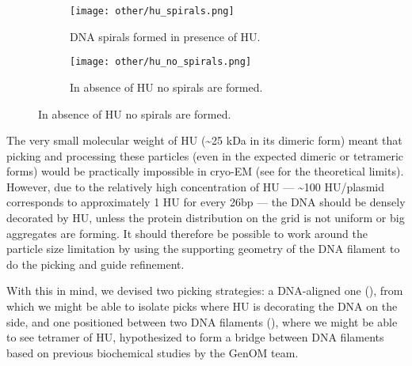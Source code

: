 \begin{figure}
    \centering
    \begin{subfigure}[B]{.49\textwidth}
        \centering
        \texttt{[image: other/hu\_spirals.png]}
        \caption{DNA spirals formed in presence of HU.}
        \label{fig:hu_spirals}
    \end{subfigure}%
    \hfill
    \begin{subfigure}[B]{.49\textwidth}
        \centering
        \texttt{[image: other/hu\_no\_spirals.png]}
        \caption{In absence of HU no spirals are formed.}
        \label{fig:hu_no_spirals}
    \end{subfigure}%
    \label{fig:hu_spirals_all}
\end{figure}

The very small molecular weight of HU (\sim25 kDa in its dimeric form) meant that picking and processing these particles (even in the expected dimeric or tetrameric forms) would be practically impossible in cryo-EM (see  for the theoretical limits).
However, due to the relatively high concentration of HU --- \sim100 HU/plasmid corresponds to approximately 1 HU for every 26bp --- the DNA should be densely decorated by HU, unless the protein distribution on the grid is not uniform or big aggregates are forming.
It should therefore be possible to work around the particle size limitation by using the supporting geometry of the DNA filament to do the picking and guide refinement.

With this in mind, we devised two picking strategies: a DNA-aligned one (), from which we might be able to isolate picks where HU is decorating the DNA on the side, and one positioned between two DNA filaments (), where we might be able to see tetramer of HU, hypothesized to form a bridge between DNA filaments based on previous biochemical studies by the GenOM team.

